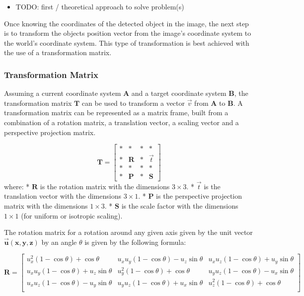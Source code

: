 \begin{itemize}
    \item TODO: first / theoretical approach to solve problem(s)
\end{itemize}
Once knowing the coordinates of the detected object in the image, 
the next step is to transform the objects position vector from the image's coordinate system to the world's coordinate system. This type of transformation is best achieved with the use of a transformation matrix.


\subsubsection{Transformation Matrix}

Assuming a current coordinate system $\mathbf{A}$ and a target coordinate system $\mathbf{B}$, the transformation matrix $\mathbf{T}$ can be used to transform a vector $\vec{v}$ from $\mathbf{A}$ to $\mathbf{B}$.
A transformation matrix can be represented as a matrix frame, built from a combination of a rotation matrix, a translation vector, a scaling vector and a perspective projection matrix.

$$
\mathbf{T} = \left[
\begin{array}{ccc|c}
\ast&\ast       &\ast&\ast\\
\ast&\mathbf{R} &\ast&\vec{t}  \\
\ast&\ast       &\ast&\ast\\
\hline
\ast&\mathbf{P} &\ast&\mathbf{S}
\end{array}
\right]
$$
where:  
* $\mathbf{R}$ is the rotation matrix with the dimensions $3\times 3$.  
* $\vec{t}$ is the translation vector with the dimensions $3\times 1$.  
* $\mathbf{P}$ is the perspective projection matrix with the dimensions $1\times 3$.  
* $\mathbf{S}$ is the scale factor with the dimensions $1\times 1$ (for uniform or isotropic scaling).

The rotation matrix for a rotation around any given axis given by the unit vector $\mathbf{\vec{u}(x,y,z)}$ by an angle $\theta$ is given by the following formula:

$$
\mathbf{R} =
\begin{bmatrix}
u_x^2(1-\cos\theta) + \cos\theta & u_xu_y(1-\cos\theta) - u_z\sin\theta & u_xu_z(1-\cos\theta) + u_y\sin\theta \\
u_xu_y(1-\cos\theta) + u_z\sin\theta & u_y^2(1-\cos\theta) + \cos\theta & u_yu_z(1-\cos\theta) - u_x\sin\theta \\
u_xu_z(1-\cos\theta) - u_y\sin\theta & u_yu_z(1-\cos\theta) + u_x\sin\theta & u_z^2(1-\cos\theta) + \cos\theta \\
\end{bmatrix}
$$

